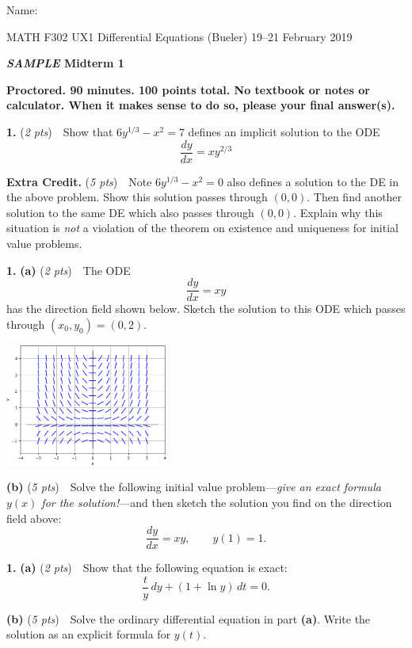 \documentclass[11pt,reqno]{amsart}
\newcommand{\dydx}{\frac{dy}{dx}}
\newcommand{\prob}[1]{\bigskip\noindent\textbf{#1.} }
\newcommand{\pts}[1]{(\emph{#1 pts})}
\newcommand{\probpts}[2]{\prob{#1} \pts{#2} \,\,}
\newcommand{\ppartpts}[2]{\textbf{(#1)} \pts{#2} \,\,}
\newcommand{\epartpts}[2]{\medskip\noindent \textbf{(#1)} \pts{#2} \,\,}
\newcommand*\circled[1]{\tikz[baseline=(char.base)]{
            \node[shape=ellipse,draw,inner sep=2pt] (char) {#1};}}
\begin{document}
\hfill \Large Name:\underline{\phantom{Ed Bueler really really long long long name}}
\medskip

\scriptsize \noindent MATH F302 UX1 Differential Equations (Bueler) \hfill 19--21 February 2019
\medskip

\Large\centerline{\textbf{\textsl{SAMPLE} Midterm 1}}

\medskip
\large
\begin{center}
\textbf{Proctored.  90 minutes.  100 points total.  No textbook or notes or calculator.  When it makes sense to do so, please \circled{circle} your final answer(s).}
\end{center}

\bigskip
\thispagestyle{empty}
\normalsize

\probpts{1}{2}  Show that $6 y^{1/3} - x^2 = 7$ defines an implicit solution to the ODE
	$$\dydx = x y^{2/3}$$
\vfill

\probpts{Extra Credit}{5}  Note $6 y^{1/3} - x^2 = 0$ also defines a solution to the DE in the above problem.  Show this solution passes through $(0,0)$.  Then find another solution to the same DE which also passes through $(0,0)$.  Explain why this situation is \emph{not} a violation of the theorem on existence and uniqueness for initial value problems.
\vfill

\prob{1} \ppartpts{a}{2}  The ODE 
	$$\dydx = xy$$
has the direction field shown below.  Sketch the solution to this ODE which passes through $(x_0,y_0)=(0,2)$.

\bigskip
\includegraphics[width=0.4\textwidth]{dirfieldxy}
\vfill

\epartpts{b}{5}  Solve the following initial value problem---\emph{give an exact formula $y(x)$ for the solution!}---and then sketch the solution you find on the direction field above:
	$$\dydx = xy, \qquad y(1)=1.$$
\vfill

\prob{1} \ppartpts{a}{2}  Show that the following equation is exact:
	$$\frac{t}{y}\,dy + (1+\ln y)\,dt = 0.$$
\vfill

\epartpts{b}{5}  Solve the ordinary differential equation in part \textbf{(a)}.  Write the solution as an explicit formula for $y(t)$.
\vfill
\end{document}
